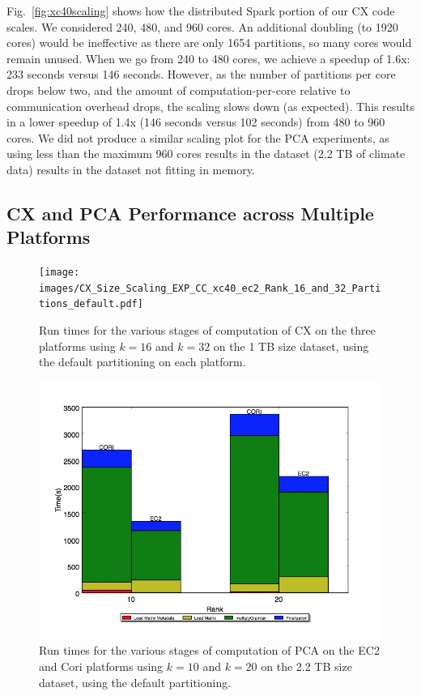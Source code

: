 Fig.~\ref{fig:xc40scaling} shows how the distributed Spark portion of our CX code scales.
We considered 240, 480, and 960 cores.  An additional doubling (to 1920 cores) would be ineffective as there are only 1654 partitions, 
so many cores would remain unused.  
When we go from 240 to 480 cores, we achieve a speedup of 1.6x:
233 seconds versus 146 seconds.  However, as the number of partitions per core drops 
below two, and the amount of computation-per-core relative to communication overhead drops, 
the scaling slows down (as expected).  
This results in a lower speedup of 1.4x (146 seconds versus 102
seconds) from 480 to 960 cores.
We did not produce a similar scaling plot for the PCA experiments, as using less
than the maximum 960 cores results in the dataset (2.2 TB of climate data)
results in the dataset not fitting in memory.

\subsection{CX and PCA Performance across Multiple Platforms}
  \label{sect:h2h}
    
    \begin{figure} [h!btp]
    \begin{centering}
      \texttt{[image: images/CX\_Size\_Scaling\_EXP\_CC\_xc40\_ec2\_Rank\_16\_and\_32\_Partitions\_default.pdf]}
    \end{centering}
    \caption{ Run times for the various stages of computation of CX on the three platforms using $k=16$ and $k=32$ on the 1 TB size dataset, using the default partitioning on each platform.} 
    \label{fig:h2hrank16} 
    \end{figure}

    \begin{figure} [h!btp]
      \begin{centering}
        \includegraphics[scale=0.3]{images/phase_stackplot_ec2_ranks_10_and_20}
      \end{centering}
      \caption{Run times for the various stages of computation of PCA on the EC2 and Cori platforms using $k=10$ and $k=20$ on the 2.2 TB size dataset, using the default partitioning.}
      \label{fig:pca_h2hranks}
    \end{figure}
    
